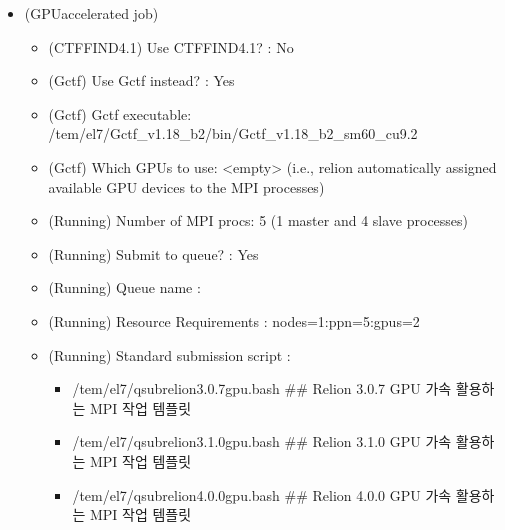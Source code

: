 \documentclass[a4paper,11pt,english]{sphinxmanual}
\begin{document}
\begin{itemize}
\item {} 
\sphinxAtStartPar
{} (GPU\sphinxhyphen{}accelerated job)
\begin{itemize}
\item {} 
\sphinxAtStartPar
(CTFFIND\sphinxhyphen{}4.1) Use CTFFIND\sphinxhyphen{}4.1? : No

\item {} 
\sphinxAtStartPar
(Gctf) Use Gctf instead? : Yes

\item {} 
\sphinxAtStartPar
(Gctf) Gctf executable: /tem/el7/Gctf\_v1.18\_b2/bin/Gctf\_v1.18\_b2\_sm60\_cu9.2

\item {} 
\sphinxAtStartPar
(Gctf) Which GPUs to use: <empty> (i.e., relion automatically assigned available GPU devices to the MPI processes)

\item {} 
\sphinxAtStartPar
(Running) Number of MPI procs: 5 (1 master and 4 slave processes)

\item {} 
\sphinxAtStartPar
(Running) Submit to queue? : Yes

\item {} 
\sphinxAtStartPar
(Running) Queue name : 

\item {} 
\sphinxAtStartPar
(Running) Resource Requirements : nodes=1:ppn=5:gpus=2

\item {} 
\sphinxAtStartPar
(Running) Standard submission script :
\begin{itemize}
\item {} 
\sphinxAtStartPar
/tem/el7/qsub\sphinxhyphen{}relion\sphinxhyphen{}3.0.7\sphinxhyphen{}gpu.bash           \#\# Relion 3.0.7 GPU 가속 활용하는 MPI 작업 템플릿

\item {} 
\sphinxAtStartPar
/tem/el7/qsub\sphinxhyphen{}relion\sphinxhyphen{}3.1.0\sphinxhyphen{}gpu.bash           \#\# Relion 3.1.0 GPU 가속 활용하는 MPI 작업 템플릿

\item {} 
\sphinxAtStartPar
/tem/el7/qsub\sphinxhyphen{}relion\sphinxhyphen{}4.0.0\sphinxhyphen{}gpu.bash           \#\# Relion 4.0.0 GPU 가속 활용하는 MPI 작업 템플릿

\end{itemize}

\end{itemize}

\end{itemize}
\end{document}

